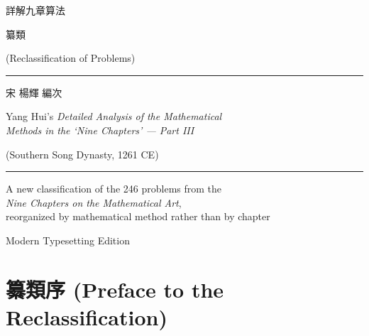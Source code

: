 \documentclass[11pt,a4paper]{article}
\newcommand{\shortline}{\noindent\rule{0.5\textwidth}{0.4pt}\par}
\begin{document}
\begin{titlepage}
\centering
\vspace*{3cm}

{\fontsize{36}{44}\selectfont\color{titlecolor} 詳解九章算法}

\vspace{1.5cm}

{\fontsize{24}{30}\selectfont\color{sectioncolor} 纂類}

\vspace{0.5cm}

{\Large\color{prefacecolor} (Reclassification of Problems)}

\vspace{2cm}

\shortline

\vspace{1cm}

{\LARGE 宋 \quad 楊輝 \quad 編次}

\vspace{0.5cm}

{\large Yang Hui's \textit{Detailed Analysis of the Mathematical\\[0.3em]
Methods in the `Nine Chapters' --- Part III}}

\vspace{0.5cm}

{\normalsize (Southern Song Dynasty, 1261 CE)}

\vspace{2cm}

\shortline

\vspace{1cm}

{\normalsize A new classification of the 246 problems from the\\
\textit{Nine Chapters on the Mathematical Art},\\
reorganized by mathematical method rather than by chapter}

\vfill

{\small Modern Typesetting Edition}

\end{titlepage}

\tableofcontents
\newpage

\section*{纂類序 (Preface to the Reclassification)}
\end{document}
